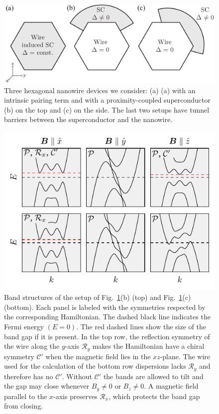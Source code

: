 \begin{figure}
\includegraphics[width=0.95\columnwidth]{figures/geometry}
\caption{Three hexagonal nanowire devices we consider: (a) (a) with an intrinsic pairing term and with a proximity-coupled superconductor (b) on the top and (c) on the side.
The last two setups have tunnel barriers between the superconductor and the nanowire.
\label{fig:geometry}}
\end{figure}

\begin{figure}
\includegraphics[width=0.95\columnwidth]{figures/bandstructure_annotated}
\caption{Band structures of the setup of Fig.~\ref{fig:geometry}(b) (top) and Fig.~\ref{fig:geometry}(c) (bottom).
Each panel is labeled with the symmetries respected by the corresponding Hamiltonian.
The dashed black line indicates the Fermi energy $(E=0)$.
The red dashed lines show the size of the band gap if it is present.
In the top row, the reflection symmetry of the wire along the $y$-axis $\mathcal{R}_y$ makes the Hamiltonian have a chiral symmetry $\mathcal{C}'$ when the magnetic field lies in the $xz$-plane.
The wire used for the calculation of the bottom row dispersions lacks $\mathcal{R}_y$ and therefore has no $\mathcal{C}'$.
Without $\mathcal{C}'$ the bands are allowed to tilt and the gap may close whenever $B_y \neq 0$ or $B_z \neq 0$.
A magnetic field parallel to the $x$-axis preserves $\mathcal{R}_x$, which protects the band gap from closing.\label{fig:bandstructure}}
\end{figure}

